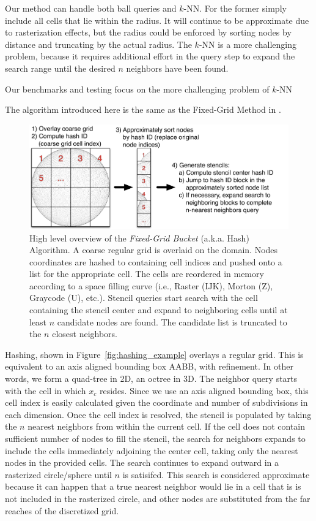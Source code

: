 \documentclass{report}
\begin{document}
Our method can handle both ball queries and $k$-NN. For the former simply include all cells that lie within the radius. It will continue to be approximate due to rasterization effects, but the radius could be enforced by sorting nodes by distance and truncating by the actual radius. The $k$-NN is a more challenging problem, because it requires additional effort in the query step to expand the search range until the desired $n$ neighbors have been found. 

Our benchmarks and testing focus on the more challenging problem of $k$-NN


The algorithm introduced here is the same as the Fixed-Grid Method in \cite{WendlandBook}.     


\begin{figure}
\centering
\includegraphics[width=1.0\textwidth]{../figures/chapter2/hashing_example/LSH_Concept.png}
\caption{High level overview of the \emph{Fixed-Grid Bucket} (a.k.a. Hash) Algorithm. A coarse regular grid is overlaid on the domain. Nodes coordinates are hashed to containing cell indices and pushed onto a list for the appropriate cell. The cells are reordered in memory according to a space filling curve (i.e., Raster (IJK), Morton (Z), Graycode (U), etc.). Stencil queries start search with the cell containing the stencil center and expand to neighboring cells until at least $n$ candidate nodes are found. The candidate list is truncated to the $n$ closest neighbors. }
\end{figure} 






Hashing, shown in Figure~\ref{fig:hashing_example} overlays a regular grid. This is equivalent to an axis aligned bounding box AABB, with refinement. In other words, we form a quad-tree in 2D, an octree in 3D. The neighbor query starts with the cell in which $x_c$ resides. Since we use an axis aligned bounding box, this cell index is easily calculated given the coordinate and number of subdivisions in each dimension. Once the cell index is resolved, the stencil is populated by taking the $n$ nearest neighbors from within the current cell. If the cell does not contain sufficient number of nodes to fill the stencil, the search for neighbors expands to include the cells immediately adjoining the center cell, taking only the nearest nodes in the provided cells. The search continues to expand outward in a rasterized circle/sphere until $n$ is satisifed. This search is considered approximate because it can happen that a true nearest neighbor would lie in a cell that is is not included in the rasterized circle, and other nodes are substituted from the far reaches of the discretized grid.
\end{document}
